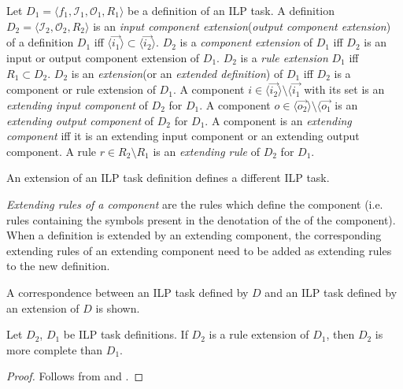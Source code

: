\begin{defn}\label{definition_ilp_task_definition_extension}
Let $D_1=\langle f_1, \mathcal{I}_1, \mathcal{O}_1, R_1 \rangle$ be a definition of an ILP task. A definition $D_2=\langle \mathcal{I}_2, \mathcal{O}_2, R_2 \rangle$ is an \emph{input component extension}(\emph{output component extension}) of a definition $D_1$ iff $\langle \overrightarrow{i_1} \rangle \subset \langle \overrightarrow{i_2} \rangle$. $D_2$ is a \emph{component extension} of $D_1$ iff $D_2$ is an input or output component extension of $D_1$. $D_2$ is a \emph{rule extension} $D_1$ iff $R_1 \subset D_2$. $D_2$ is an \emph{extension}(or an \emph{extended definition}) of $D_1$ iff $D_2$ is a component or rule extension of $D_1$.
A component $i \in \langle \overrightarrow{i_2} \rangle \setminus \langle \overrightarrow{i_1}$ with its set is an \emph{extending input component} of $D_2$ for $D_1$.
A component $o \in \langle \overrightarrow{o_2} \rangle \setminus \langle \overrightarrow{o_1}$ is an \emph{extending output component} of $D_2$ for $D_1$.
A component is an \emph{extending component} iff it is an extending input component or an extending output component.
A rule $r \in R_2 \setminus R_1$ is an \emph{extending rule} of $D_2$ for $D_1$.
\end{defn}

\begin{remark}
An extension of an ILP task definition defines a different ILP task.
\end{remark}

\begin{remark}
\emph{Extending rules of a component} are the rules which define the component (i.e. rules containing the symbols present in the denotation of the of the component). When a definition is extended by an extending component, the corresponding extending rules of an extending component need to be added as extending rules to the new definition.
\end{remark}

A correspondence between an ILP task defined by $D$ and an ILP task defined by an extension of $D$ is shown.

\begin{corollary}
Let $D_2$, $D_1$ be ILP task definitions. If $D_2$ is a rule extension of $D_1$, then $D_2$ is more complete than $D_1$.
\end{corollary}
\begin{proof}
Follows from  and .
\end{proof}

